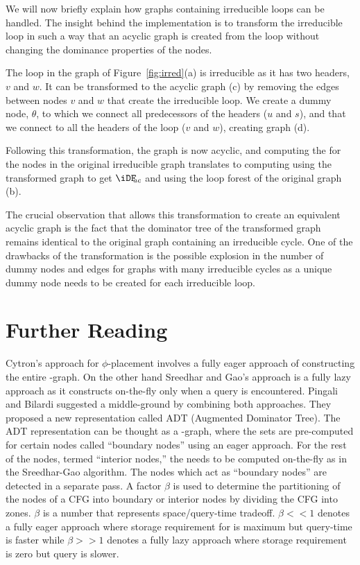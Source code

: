 {We will now briefly explain how graphs containing irreducible loops can be 
handled. The insight behind the implementation is to transform the irreducible 
loop in such a way that an acyclic graph is created from the loop without 
changing the dominance properties of the nodes.

The loop in the graph of Figure~\ref{fig:irred}(a) is irreducible as it has two 
headers, $v$ and $w$.
It can be transformed to the acyclic graph (c) by removing 
the edges between nodes $v$ and $w$ that create the irreducible loop.
We create a dummy node, $\theta$, to which we connect all predecessors of the 
headers ($u$ and $s$), and that we connect to all the headers of the loop 
($v$ and $w$), creating graph (d).

Following this transformation, the graph is now acyclic, and
computing the \iDF for the nodes in the original 
irreducible graph translates to computing \iDF using the transformed graph to 
get $\iDFac$ and using the loop forest of the original graph (b).

The 
crucial observation that allows this transformation to create an equivalent 
acyclic graph is the fact that the dominator tree of the transformed graph 
remains identical to the original graph containing an irreducible cycle. One of 
the drawbacks of the transformation is the possible explosion in the number of 
dummy nodes and edges for graphs with many irreducible cycles as a unique dummy 
node needs to be created for each irreducible loop.


\section{Further Reading}

Cytron's approach for $\phi$-placement involves a fully eager approach of constructing the entire \DF-graph. On the other hand Sreedhar and Gao's approach is a fully lazy approach as it constructs \DF on-the-fly only when a query is encountered.
Pingali and Bilardi \cite{bilardi} suggested a middle-ground by combining both 
approaches. They proposed a new representation called ADT (Augmented Dominator 
Tree). The ADT representation can be thought as a \DJ-graph, where the \DF sets 
are pre-computed for certain nodes called ``boundary nodes'' using an eager 
approach. For the rest of the nodes, termed ``interior nodes,'' the \DF needs 
to be computed on-the-fly as in the Sreedhar-Gao algorithm. The nodes which act 
as ``boundary nodes'' are detected in a separate pass. A factor $\beta$ is used 
to determine the partitioning of the nodes of a CFG into boundary or interior 
nodes by dividing the CFG into zones. $\beta$ is a number that represents 
space/query-time tradeoff. $\beta <\!\!< 1$ denotes a fully eager approach where 
storage requirement for \DF is maximum but query-time is faster while 
$\beta >\!\!> 1$ denotes a fully lazy approach where storage requirement is zero but 
query is 
slower. 

}
